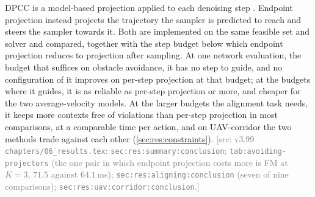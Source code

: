 \documentclass[headsepline,footsepline,footinclude=false,oneside,fontsize=11pt,paper=a4,listof=totoc,bibliography=totoc]{scrbook}
\theoremstyle{definition}
\theoremstyle{plain}
\theoremstyle{remark}
\newcommand{\nfe}{K}                           %
\newif\ifsubmission
\newcommand{\srcnote}[1]{\ifsubmission\else\textcolor{gray}{\footnotesize\textsf{[src: #1]}}\fi}
\begin{document}
\begin{enumerate}
    DPCC is a model-based projection applied to each denoising step \parencite{romer2025diffusion}.
    Endpoint projection \parencite{li2025hardflow} instead projects the trajectory the sampler is
    predicted to reach and steers the sampler towards it. Both are implemented on the same feasible set
    and solver and compared, together with the step budget below which endpoint projection reduces to
    projection after sampling. At one network evaluation, the budget that suffices on obstacle
    avoidance, it has no step to guide, and no configuration of it improves on per-step projection at
    that budget; at the budgets where it guides, it is as reliable as per-step projection or more, and
    cheaper for the two average-velocity models. At the larger budgets the alignment task needs, it
    keeps more contexts free of violations than per-step projection in most comparisons, at a
    comparable time per action, and on UAV-corridor the two methods trade against each other
    (\autoref{sec:res:constraints}).
    \srcnote{v3.99 \texttt{chapters/06\_results.tex}: \texttt{sec:res:summary:conclusion};
    \texttt{tab:avoiding-projectors} (the one pair in which endpoint projection costs more is FM at
    $\nfe=3$, $71.5$ against $64.1$\,ms); \texttt{sec:res:aligning:conclusion} (seven of nine
    comparisons); \texttt{sec:res:uav:corridor:conclusion}.}
\end{enumerate}
\end{document}
